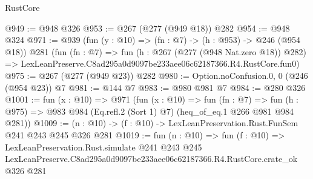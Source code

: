 \begin{lexlean}{RustCore}
\begin{coremodule}
@949 := @948 @326
@953 := @267 (@277 (@949 @18)) @282
@954 := @948 @324
@971 := @939
    (fun (y : @10) => (fn : @7) -> (h : @953) -> @246 (@954 @18))
    @281
    (fun (fn : @7) =>
    fun (h : @267 (@277 (@948 Nat.zero @18)) @282) =>
    LexLeanPreserve.C8ad295a0d9097be233aee06c62187366.R4.RustCore.fun0)
@975 := @267 (@277 (@949 @23)) @282
@980 := Option.noConfusion.{0, 0} (@246 (@954 @23)) @7
@981 := @144 @7
@983 := @980 @981 @7
@984 := @280 @326
@1001 := fun (x : @10) =>
  @971
    (fun (x : @10) =>
    fun (fn : @7) =>
    fun (h : @975) => @983 @984 (Eq.refl.{2} (Sort 1) @7) (heq_of_eq.{1} @266 @981 @984 @281))
@1009 := (n : @10) -> (f : @10) -> LexLeanPreservation.Rust.FunSem @241 @243 @245 @326 @281
@1019 := fun (n : @10) =>
  fun (f : @10) =>
  LexLeanPreservation.Rust.simulate
    @241
    @243
    @245
    LexLeanPreserve.C8ad295a0d9097be233aee06c62187366.R4.RustCore.crate_ok
    @326
    @281
\end{coremodule}
\end{lexlean}
